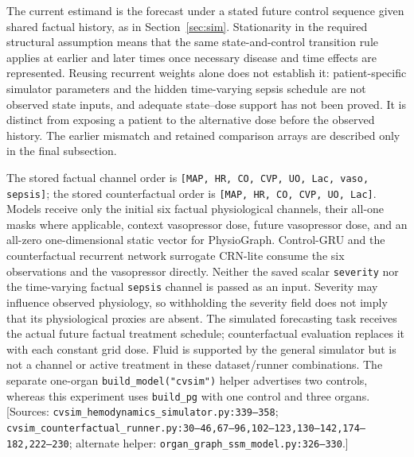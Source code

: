 The current estimand is the forecast under a stated future control sequence given shared factual history, as in Section~\ref{sec:sim}. Stationarity in the required structural assumption means that the same state-and-control transition rule applies at earlier and later times once necessary disease and time effects are represented. Reusing recurrent weights alone does not establish it: patient-specific simulator parameters and the hidden time-varying sepsis schedule are not observed state inputs, and adequate state--dose support has not been proved. It is distinct from exposing a patient to the alternative dose before the observed history. The earlier mismatch and retained comparison arrays are described only in the final subsection.

The stored factual channel order is \texttt{[MAP,\allowbreak{} HR,\allowbreak{} CO,\allowbreak{} CVP,\allowbreak{} UO,\allowbreak{} Lac,\allowbreak{} vaso,\allowbreak{} sepsis]}; the stored counterfactual order is \texttt{[MAP,\allowbreak{} HR,\allowbreak{} CO,\allowbreak{} CVP,\allowbreak{} UO,\allowbreak{} Lac]}. Models receive only the initial six factual physiological channels, their all-one masks where applicable, context vasopressor dose, future vasopressor dose, and an all-zero one-dimensional static vector for PhysioGraph. Control-GRU and the counterfactual recurrent network surrogate CRN-lite consume the six observations and the vasopressor directly. Neither the saved scalar \texttt{severity} nor the time-varying factual \texttt{sepsis} channel is passed as an input. Severity may influence observed physiology, so withholding the severity field does not imply that its physiological proxies are absent. The simulated forecasting task receives the actual future factual treatment schedule; counterfactual evaluation replaces it with each constant grid dose. Fluid is supported by the general simulator but is not a channel or active treatment in these dataset/runner combinations. The separate one-organ \texttt{build\_\allowbreak{}model("cvsim")} helper advertises two controls, whereas this experiment uses \texttt{build\_\allowbreak{}pg} with one control and three organs. [Sources: \texttt{cvsim\_\allowbreak{}hemodynamics\_\allowbreak{}simulator.\allowbreak{}py:\allowbreak{}339–\allowbreak{}358}; \texttt{cvsim\_\allowbreak{}counterfactual\_\allowbreak{}runner.\allowbreak{}py:\allowbreak{}30–\allowbreak{}46,\allowbreak{}67–\allowbreak{}96,\allowbreak{}102–\allowbreak{}123,\allowbreak{}130–\allowbreak{}142,\allowbreak{}174–\allowbreak{}182,\allowbreak{}222–\allowbreak{}230}; alternate helper: \texttt{organ\_\allowbreak{}graph\_\allowbreak{}ssm\_\allowbreak{}model.\allowbreak{}py:\allowbreak{}326–\allowbreak{}330}.]

